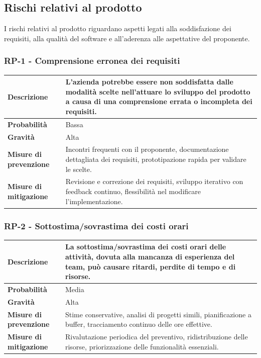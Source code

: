 \documentclass[11pt,a4paper]{article}
\begin{document}
\subsection{Rischi relativi al prodotto}
I rischi relativi al prodotto riguardano aspetti legati alla soddisfazione dei requisiti, alla qualità del software e all'aderenza alle aspettative del proponente.

\subsubsection{RP-1 - Comprensione erronea dei requisiti}
\begin{center}
\begin{tabular}{|p{3cm}|p{12cm}|}
    \hline
    \textbf{Descrizione} & L'azienda potrebbe essere non soddisfatta dalle modalità scelte nell'attuare lo sviluppo del prodotto a causa di una comprensione errata o incompleta dei requisiti. \\
    \hline
    \textbf{Probabilità} & Bassa \\
    \hline
    \textbf{Gravità} & Alta \\
    \hline
    \textbf{Misure di prevenzione} & Incontri frequenti con il proponente, documentazione dettagliata dei requisiti, prototipazione rapida per validare le scelte. \\
    \hline
    \textbf{Misure di mitigazione} & Revisione e correzione dei requisiti, sviluppo iterativo con feedback continuo, flessibilità nel modificare l'implementazione. \\
    \hline
\end{tabular}
\end{center}

\subsubsection{RP-2 - Sottostima/sovrastima dei costi orari}
\begin{center}
\begin{tabular}{|p{3cm}|p{12cm}|}
    \hline
    \textbf{Descrizione} & La sottostima/sovrastima dei costi orari delle attività, dovuta alla mancanza di esperienza del team, può causare ritardi, perdite di tempo e di risorse. \\
    \hline
    \textbf{Probabilità} & Media \\
    \hline
    \textbf{Gravità} & Alta \\
    \hline
    \textbf{Misure di prevenzione} & Stime conservative, analisi di progetti simili, pianificazione a buffer, tracciamento continuo delle ore effettive. \\
    \hline
    \textbf{Misure di mitigazione} & Rivalutazione periodica del preventivo, ridistribuzione delle risorse, priorizzazione delle funzionalità essenziali. \\
    \hline
\end{tabular}
\end{center}
\end{document}
